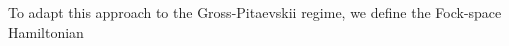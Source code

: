 \documentclass[11pt,a4paper,DIV11]{scrartcl}	%
\newcommand{\cU}{{\cal U}}
\newcommand{\cH}{{\cal H}}
\newcommand{\cL}{{\cal L}}
\begin{document}
%
To adapt this approach to the Gross-Pitaevskii regime, we define the Fock-space Hamiltonian
\end{document}
